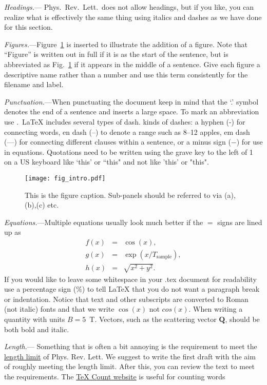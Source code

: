 \documentclass[aps,prl,showpacs,floatfix,twocolumn,superscriptaddress,longbibliography]{revtex4-2}
\def\Q{\ensuremath{\bm{Q}}}
\begin{document}
\textit{Headings.}--- Phys.\ Rev.\ Lett.\ does not allow headings, but if you like, you can realize what is effectively the same thing using italics and dashes as we have done for this section.

\textit{Figures.}---Figure~\ref{fig_intro} is inserted to illustrate the addition of a figure. Note that ``Figure'' is written out in full if it is as the start of the sentence, but is abbreviated as Fig.~\ref{fig_intro} if it appears in the middle of a sentence. Give each figure a descriptive name rather than a number and use this term consistently for the filename and label.

\textit{Punctuation.}---When punctuating the document keep in mind that the `.' symbol denotes the end of a sentence and inserts a large space. To mark an abbreviation use .\
\LaTeX{} includes several types of dash. 
kinds of dashes: a hyphen (-) for connecting words, en dash (--) to denote a range such as 8--12 apples, em dash (---) for connecting different clauses within a sentence, or a minus sign ($-$) for use in equations. Quotations need to be written using the grave key to the left of 1 on a US keyboard like `this' or ``this" and not like 'this' or "this".

\begin{figure}
\texttt{[image: fig\_intro.pdf]}
\caption{This is the figure caption. Sub-panels should be referred to via (a),(b),(c) etc.}
\label{fig_intro}
\end{figure}

\emph{Equations.}---Multiple equations usually look much better if the $=$ signs are lined up as
%
\begin{eqnarray}
   f(x) & = & \cos(x)  ,  \\
   g(x) & = & \exp(x/T_\text{sample})   ,   \\
   h(x) & = &  \sqrt{x^2+y^2}.
\end{eqnarray}
%
If you would like to leave some whitespace in your .tex document for readability use a percentage sign (\%) to tell \LaTeX{} that you do not want a paragraph break or indentation. Notice that text and other subscripts are converted to Roman (not italic) fonts and that we write $\cos(x)$ not $cos(x)$. When writing a quantity with units $B=5$~T. Vectors, such as the scattering vector \Q{}, should be both bold and italic. 

\emph{Length.}--- Something that is often a bit annoying is the requirement to meet the \href{https://journals.aps.org/authors/length-guide}{length limit} of Phys. Rev. Lett. We suggest to write the first draft with the aim of roughly meeting the length limit. After this, you can review the text to meet the requirements. The \href{https://app.uio.no/ifi/texcount/}{TeX Count website} is useful for counting words  
\end{document}
